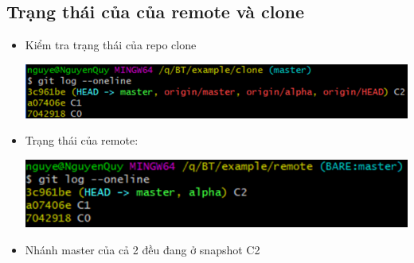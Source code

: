 \documentclass[12pt,a4paper]{report}
\begin{document}
\subsection{Trạng thái của của remote và clone}
\begin{itemize}
\item Kiểm tra trạng thái của repo clone

 	\includegraphics[width=0.8\linewidth]{screenshot067}
 
 	\label{fig:screenshot067}

\item Trạng thái của remote:

 	\includegraphics[width=0.8\linewidth]{screenshot068}

 	\label{fig:screenshot068}

\item Nhánh master của cả 2 đều đang ở snapshot C2
\end{itemize}
\end{document}
